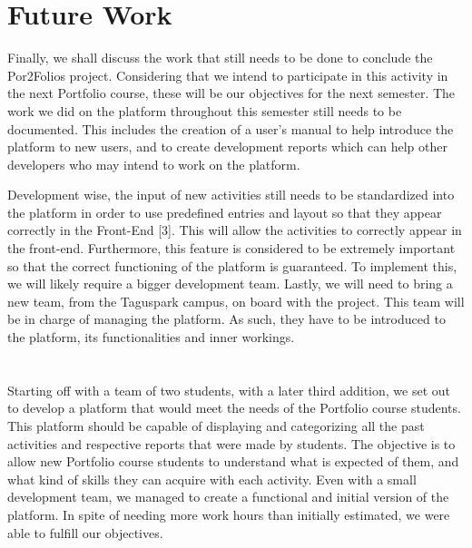 \documentclass[a4paper,12pt,journal,twoside,compsoc]{PPIEEEtran}
\begin{document}

\section{Future Work}

Finally, we shall discuss the work that still needs to be done to conclude the Por2Folios project. Considering that we intend to participate in this activity in the next Portfolio course, these will be our objectives for the next semester.
The work we did on the platform throughout this semester still needs to be documented. This includes the creation of a user’s manual to help introduce the platform to new users, and to create development reports which can help other developers who may intend to work on the platform.

Development wise, the input of new activities still needs to be standardized into the platform in order to use predefined entries and layout so that they appear correctly in the Front-End [3]. This will allow the activities to correctly appear in the front-end. Furthermore, this feature is considered to be extremely important so that the correct functioning of the platform is guaranteed. To implement this, we will likely require a bigger development team.
Lastly, we will need to bring a new team, from the Taguspark campus, on board with the project. This team will be in charge of managing the platform. As such, they have to be introduced to the platform, its functionalities and inner workings.



\section{}

Starting off with a team of two students, with a later third addition, we set out to develop a platform that would meet the needs of the Portfolio course students. This platform should be capable of displaying and categorizing all the past activities and respective reports that were made by students. The objective is to allow new Portfolio course students to understand what is expected of them, and what kind of skills they can acquire with each activity. Even with a small development team, we managed to create a functional and initial version of the platform. In spite of needing more work hours than initially estimated, we were able to fulfill our objectives.
\end{document}
